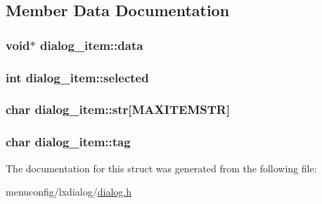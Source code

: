 \subsection{Member Data Documentation}
\hypertarget{structdialog__item_aee151fe91bcb5d1767d9df8877fd02c1}{
\subsubsection[{data}]{\setlength{\rightskip}{0pt plus 5cm}void$\ast$ dialog\-\_\-item\-::data}}\label{structdialog__item_aee151fe91bcb5d1767d9df8877fd02c1}
\hypertarget{structdialog__item_ad765ac3f7715a975be0449dca146182e}{
\subsubsection[{selected}]{\setlength{\rightskip}{0pt plus 5cm}int dialog\-\_\-item\-::selected}}\label{structdialog__item_ad765ac3f7715a975be0449dca146182e}
\hypertarget{structdialog__item_a55afa5c6bf6cf24ebed6f97e66e4ded5}{
\subsubsection[{str}]{\setlength{\rightskip}{0pt plus 5cm}char dialog\-\_\-item\-::str\mbox{[}{\bf M\-A\-X\-I\-T\-E\-M\-S\-T\-R}\mbox{]}}}\label{structdialog__item_a55afa5c6bf6cf24ebed6f97e66e4ded5}
\hypertarget{structdialog__item_a550d3c23b256d2e136aa275fa91419da}{
\subsubsection[{tag}]{\setlength{\rightskip}{0pt plus 5cm}char dialog\-\_\-item\-::tag}}\label{structdialog__item_a550d3c23b256d2e136aa275fa91419da}


The documentation for this struct was generated from the following file\-:\begin{DoxyCompactItemize}
\item 
menuconfig/lxdialog/\hyperlink{dialog_8h}{dialog.\-h}\end{DoxyCompactItemize}
